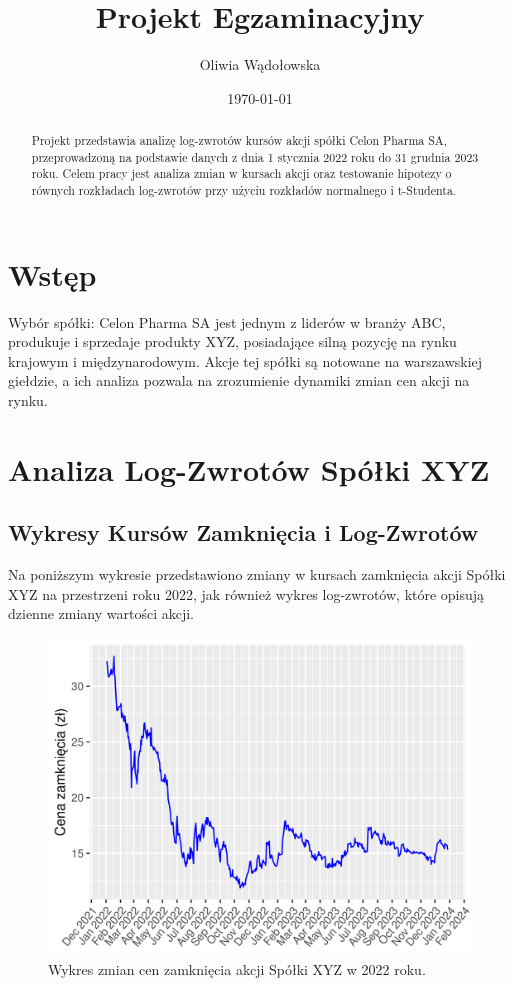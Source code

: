 \documentclass[a4paper,12pt]{article}
\title{Projekt Egzaminacyjny}
\author{Oliwia Wądołowska}
\date{\today}
\begin{document}
\maketitle

\begin{abstract}
Projekt przedstawia analizę log-zwrotów kursów akcji spółki Celon Pharma SA, przeprowadzoną na podstawie danych z dnia 1 stycznia 2022 roku do 31 grudnia 2023 roku. Celem pracy jest analiza zmian w kursach akcji oraz testowanie hipotezy o równych rozkładach log-zwrotów przy użyciu rozkładów normalnego i t-Studenta.
\end{abstract}

\tableofcontents
\newpage

\section{Wstęp}
Wybór spółki: Celon Pharma SA jest jednym z liderów w branży ABC, produkuje i sprzedaje produkty XYZ, posiadające silną pozycję na rynku krajowym i międzynarodowym. Akcje tej spółki są notowane na warszawskiej giełdzie, a ich analiza pozwala na zrozumienie dynamiki zmian cen akcji na rynku.

\section{Analiza Log-Zwrotów Spółki XYZ}
\subsection{Wykresy Kursów Zamknięcia i Log-Zwrotów}
Na poniższym wykresie przedstawiono zmiany w kursach zamknięcia akcji Spółki XYZ na przestrzeni roku 2022, jak również wykres log-zwrotów, które opisują dzienne zmiany wartości akcji.

\begin{figure}[h!]
\centering
\includegraphics[width=\textwidth]{img/Wykres_cen_akcji_cln.png}
\caption{Wykres zmian cen zamknięcia akcji Spółki XYZ w 2022 roku.}
\end{figure}
\end{document}
